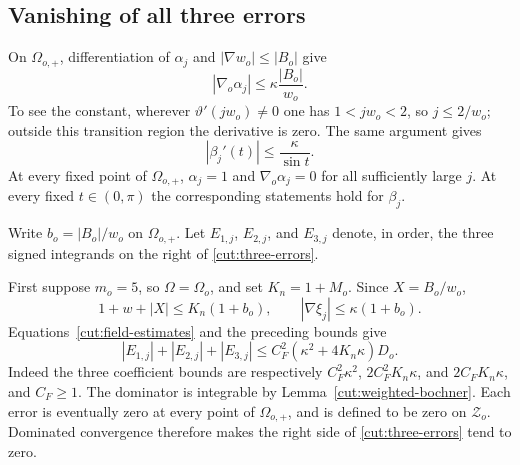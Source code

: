 \subsection{Vanishing of all three errors}

On $\Omega_{o,+}$, differentiation of $\alpha_j$ and
$|\nabla w_o|\leq|B_o|$ give
\begin{equation}\label{cut:original-cutoff-gradient}
 |\nabla_o\alpha_j|
 \leq\kappa\frac{|B_o|}{w_o}.
\end{equation}
To see the constant, wherever $\vartheta'(jw_o)\ne0$ one has
$1<jw_o<2$, so $j\leq2/w_o$; outside this transition region the derivative
is zero.  The same argument gives
\begin{equation}\label{cut:tip-cutoff-gradient}
 |\beta_j'(t)|\leq\frac{\kappa}{\sin t}.
\end{equation}
At every fixed point of $\Omega_{o,+}$, $\alpha_j=1$ and
$\nabla_o\alpha_j=0$ for all sufficiently large $j$.  At every fixed
$t\in(0,\pi)$ the corresponding statements hold for $\beta_j$.

Write $b_o=|B_o|/w_o$ on $\Omega_{o,+}$.  Let $E_{1,j}$, $E_{2,j}$,
and $E_{3,j}$ denote, in order, the three signed integrands on the right
of \eqref{cut:three-errors}.

First suppose $m_o=5$, so $\Omega=\Omega_o$, and set $K_n=1+M_o$.
Since $X=B_o/w_o$,
\[
 1+w+|X|\leq K_n(1+b_o),\qquad
 |\nabla\xi_j|\leq\kappa(1+b_o).
\]
Equations~\eqref{cut:field-estimates} and the preceding bounds give
\begin{equation}\label{cut:nonsuspended-domination}
 |E_{1,j}|+|E_{2,j}|+|E_{3,j}|
 \leq C_F^2(\kappa^2+4K_n\kappa)D_o.
\end{equation}
Indeed the three coefficient bounds are respectively
$C_F^2\kappa^2$, $2C_F^2K_n\kappa$, and $2C_FK_n\kappa$,
and $C_F\geq1$.  The dominator is integrable by
Lemma~\ref{cut:weighted-bochner}.  Each error is eventually zero at
every point of $\Omega_{o,+}$, and is defined to be zero on
$\mathcal Z_o$.  Dominated convergence therefore makes the right side
of \eqref{cut:three-errors} tend to zero.

